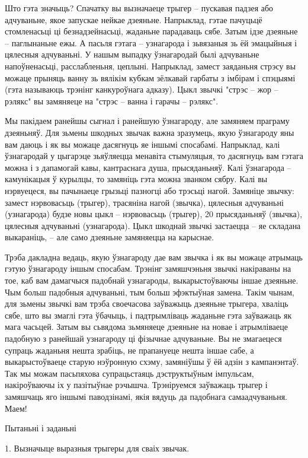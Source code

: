 Што гэта значыць? Спачатку вы вызначаеце трыгер – пускавая падзея або адчуваньне, якое запускае нейкае дзеяньне. Напрыклад, гэтае пачуцьцё стомленасьці ці безнадзейнасьці, жаданьне парадаваць сябе. Затым ідзе дзеяньне – паглынаньне ежы. А пасьля гэтага – узнагарода і зьвязаныя зь ёй эмацыйныя і цялесныя адчуваньні. У нашым выпадку ўзнагародай былі адчуваньне напоўненасьці, расслабленьня, цеплыні. Напрыклад, замест заяданьня стрэсу вы можаце прыняць ванну зь вялікім кубкам зёлкавай гарбаты з імбірам і спэцыямі (гэта называюць трэнінг канкуроўнага адказу). Цыкл звычкі "стрэс – жор – рэлякс" вы замяняеце на "стрэс – ванна і гарачы – рэлякс".

Мы пакідаем ранейшы сыгнал і ранейшую ўзнагароду, але замяняем праграму дзеяньняў. Для зьмены шкодных звычак важна зразумець, якую ўзнагароду яны вам даюць і як вы можаце дасягнуць яе іншымі спосабамі. Напрыклад, калі ўзнагародай у цыгарэце зьяўляецца менавіта стымуляцыя, то дасягнуць вам гэтага можна і з дапамогай кавы, кантраснага душа, прысяданьняў. Калі ўзнагарода – камунікацыя ў курылцы, то замяніць гэта можна званком сябру. Калі вы нэрвуецеся, вы пачынаеце грызьці пазногці або трэсьці нагой. Замяніце звычку: замест нэрвовасьць (трыгер), трасяніна нагой (звычка), цялесныя адчуваньні (узнагарода) будзе новы цыкл – нэрвовасьць (трыгер), 20 прысяданьняў (звычка), цялесныя адчуваньні (узнагарода). Цыкл шкоднай звычкі застаецца – яе складана выкараніць, – але само дзеяньне замяняецца на карыснае.

Трэба дакладна ведаць, якую ўзнагароду дае вам звычка і як вы можаце атрымаць гэтую ўзнагароду іншым спосабам. Трэнінг замяшчэньня звычкі накіраваны на тое, каб вам дамагчыся падобнай узнагароды, выкарыстоўваючы іншае дзеяньне. Чым больш падобныя адчуваньні, тым больш эфэктыўная замена. Такім чынам, для зьмены звычкі вам трэба своечасова заўважыць дзеяньне трыгера, хваліць сябе, што вы змаглі гэта ўбачыць, і падтрымліваць жаданьне гэта заўважаць як мага часьцей. Затым вы сьвядома зьмяняеце дзеяньне на новае і атрымліваеце падобную з ранейшай узнагароду ці фізычнае адчуваньне. Вы не змагаецеся супраць жаданьня нешта зрабіць, не прапануеце нешта іншае сабе, а выкарыстоўваеце старую нэўронную схэму, замяніўшы ў ёй адзін з кампанэнтаў. Так мы можам пасьпяхова супрацьстаяць дэструктыўным імпульсам, накіроўваючы іх у пазітыўнае рэчышча. Трэніруемся заўважаць трыгер і замяшчаць яго іншымі паводзінамі, якія вядуць да падобнага самаадчуваньня. Маем!

Пытаньні і заданьні

1. Вызначыце выразныя трыгеры для сваіх звычак.

